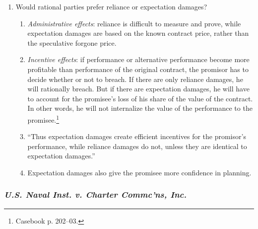 \begin{enumerate}
\begin{enumerate}
        contracting parties would have reached when bargaining under ideal 
        conditions.''\footnote{Casebook p. 202.}
        \item Would rational parties prefer reliance or expectation damages?
        \begin{enumerate}
            \item \emph{Administrative effects}: reliance is difficult to 
            measure and prove, while expectation damages are based on the 
            known contract price, rather than the speculative forgone price.
            \item \emph{Incentive effects}: if performance or alternative 
            performance become more profitable than performance of the 
            original contract, the promisor has to decide whether or not to 
            breach. If there are only reliance damages, he will rationally 
            breach. But if there are expectation damages, he will have to 
            account for the promisee's loss of his share of the value of the 
            contract. In other words, he will not internalize the value of the 
            performance to the promisee.\footnote{Casebook p. 202--03.}
            \item ``Thus expectation damages create efficient incentives for 
            the promisor's performance, while reliance damages do not, unless 
            they are identical to expectation damages.''
            \item Expectation damages also give the promisee more confidence 
            in planning.
        \end{enumerate}
    \end{enumerate}
\end{enumerate}

\subsubsection{\emph{U.S. Naval Inst. v. Charter Commc'ns, Inc.}}

